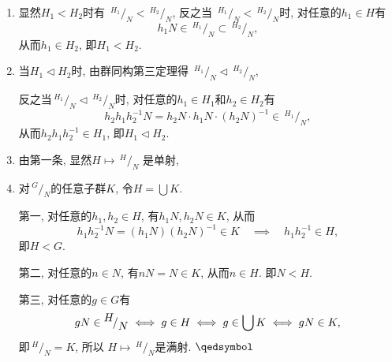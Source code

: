 \documentclass[UTF8]{ctexart}
\begin{document}

\begin{enumerate}
    \item 显然$H_1<H_2$时有
    $\,\!^{\displaystyle H_1}\!/_{\displaystyle N}<
    \,\!^{\displaystyle H_2}\!/_{\displaystyle N}$, 反之当
    $\,\!^{\displaystyle H_1}\!/_{\displaystyle N}<
    \,\!^{\displaystyle H_2}\!/_{\displaystyle N}$时, 对任意的$h_1\in H$有
    \vspace{3pt}
    \[
        h_1N\in\,\!^{\displaystyle H_1}\!/_{\displaystyle N}\subset
        \,\!^{\displaystyle H_2}\!/_{\displaystyle N},
    \]
    从而$h_1\in H_2$, 即$H_1<H_2$.

    \item 当$H_1\lhd H_2$时, 由群同构第三定理得
    $\,\!^{\displaystyle H_1}\!/_{\displaystyle N}\lhd
    \,\!^{\displaystyle H_2}\!/_{\displaystyle N}$,
    
    \vspace{3pt}\hspace{2.17em}
    反之当$\,\!^{\displaystyle H_1}\!/_{\displaystyle N}\lhd
    \,\!^{\displaystyle H_2}\!/_{\displaystyle N}$时,
    对任意的$h_1\in H_1$和$h_2\in H_2$有
    \[
        h_2h_1h_2^{-1}N=h_2N\cdot h_1N\cdot(h_2N)^{-1}\in
        \,\!^{\displaystyle H_1}\!/_{\displaystyle N},
    \]
    从而$h_2h_1h_2^{-1}\in H_1$, 即$H_1\lhd H_2$.

    \vspace{3pt}
    \item 由第一条, 显然$H\mapsto\,\!^{\displaystyle H}\!/_{\displaystyle N}$
    是单射,

    \vspace{3pt}
    \item 对$\,\!^{\displaystyle G}\!/_{\displaystyle N}$的任意子群$K$,
    令$\displaystyle H=\bigcup K$.

    \vspace{3pt}\hspace{2.17em}
    第一, 对任意的$h_1,h_2\in H$, 有$h_1N,h_2N\in K$, 从而
    \[
        h_1h_2^{-1}N=(h_1N)(h_2N)^{-1}\in K\quad\implies\quad h_1h_2^{-1}\in H,
    \]
    即$H<G$.

    \hspace{2.17em}
    第二, 对任意的$n\in N$, 有$nN=N\in K$, 从而$n\in H$. 即$N<H$.

    \hspace{2.17em}
    第三, 对任意的$g\in G$有
    \[
        gN\in\,\!^{\displaystyle H}\!/_{\displaystyle N}\iff
        g\in H\iff g\in\bigcup K\iff gN\in K,\\[3pt]
    \]
    即$\,\!^{\displaystyle H}\!/_{\displaystyle N}=K$, 所以
    $H\mapsto\,\!^{\displaystyle H}\!/_{\displaystyle N}$是满射. \hfill $\qedsymbol$
\end{enumerate}
\end{document}
